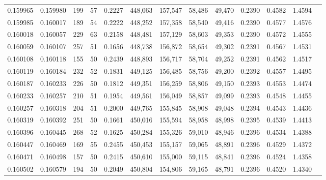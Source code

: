 \begin{tabular}{rrrrrrrrrrrrr}
0.159965 & 0.159980 &   199 &  57 &                                     0.2227 & 448,063 & 157,547 &  58,486 &  49,470 & 0.2390 & 0.4582 & 1.4594 \\
0.159985 & 0.160017 &   189 &  54 &                                     0.2222 & 448,252 & 157,358 &  58,540 &  49,416 & 0.2390 & 0.4577 & 1.4576 \\
0.160018 & 0.160057 &   229 &  63 &                                     0.2158 & 448,481 & 157,129 &  58,603 &  49,353 & 0.2390 & 0.4572 & 1.4555 \\
0.160059 & 0.160107 &   257 &  51 &                                     0.1656 & 448,738 & 156,872 &  58,654 &  49,302 & 0.2391 & 0.4567 & 1.4531 \\
0.160108 & 0.160118 &   155 &  50 &                                     0.2439 & 448,893 & 156,717 &  58,704 &  49,252 & 0.2391 & 0.4562 & 1.4517 \\
0.160119 & 0.160184 &   232 &  52 &                                     0.1831 & 449,125 & 156,485 &  58,756 &  49,200 & 0.2392 & 0.4557 & 1.4495 \\
0.160187 & 0.160233 &   226 &  50 &                                     0.1812 & 449,351 & 156,259 &  58,806 &  49,150 & 0.2393 & 0.4553 & 1.4474 \\
0.160233 & 0.160257 &   210 &  51 &                                     0.1954 & 449,561 & 156,049 &  58,857 &  49,099 & 0.2393 & 0.4548 & 1.4455 \\
0.160257 & 0.160318 &   204 &  51 &                                     0.2000 & 449,765 & 155,845 &  58,908 &  49,048 & 0.2394 & 0.4543 & 1.4436 \\
0.160319 & 0.160392 &   251 &  50 &                                     0.1661 & 450,016 & 155,594 &  58,958 &  48,998 & 0.2395 & 0.4539 & 1.4413 \\
0.160396 & 0.160445 &   268 &  52 &                                     0.1625 & 450,284 & 155,326 &  59,010 &  48,946 & 0.2396 & 0.4534 & 1.4388 \\
0.160447 & 0.160469 &   169 &  55 &                                     0.2455 & 450,453 & 155,157 &  59,065 &  48,891 & 0.2396 & 0.4529 & 1.4372 \\
0.160471 & 0.160498 &   157 &  50 &                                     0.2415 & 450,610 & 155,000 &  59,115 &  48,841 & 0.2396 & 0.4524 & 1.4358 \\
0.160502 & 0.160579 &   194 &  50 &                                     0.2049 & 450,804 & 154,806 &  59,165 &  48,791 & 0.2396 & 0.4520 & 1.4340 \\

\end{tabular}
